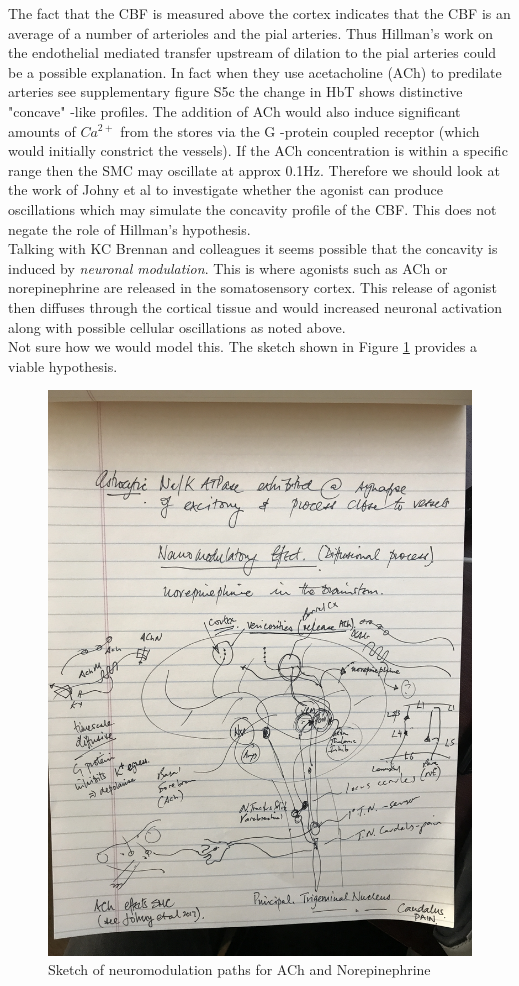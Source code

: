 \documentclass{article}
\begin{document}
{The fact that the CBF is measured above the cortex indicates that the CBF is an average of a number of arterioles and the pial arteries. Thus Hillman's work \cite{Chen2014a} on the endothelial mediated transfer upstream of dilation to the pial arteries could be a possible explanation. In fact when they use acetacholine (ACh) to predilate arteries see supplementary figure S5c the change in HbT shows distinctive "concave" -like profiles. The addition of ACh would also induce significant amounts of $Ca^{2+}$ from the stores via the G -protein coupled receptor (which would initially constrict the vessels). If the ACh concentration is within a specific range then the SMC may oscillate at approx 0.1Hz. Therefore we should look at the work of Johny et al \cite{Johny2017} to investigate whether the agonist can produce oscillations which may simulate the concavity profile of the CBF. This does not negate the role of Hillman's hypothesis.\\
Talking with KC Brennan and colleagues it seems possible that the concavity is induced by \textit{neuronal modulation}. This is where agonists such as ACh or norepinephrine are released in the somatosensory cortex. This release of agonist then diffuses through the cortical tissue and would increased neuronal activation along with possible cellular oscillations as noted above. \\
Not sure how we would model this. The sketch shown in Figure \ref{fig:Neuromodulation_paths} provides a viable hypothesis. }
\begin{figure}[h!]
\centering
\includegraphics[width=0.7\linewidth, angle = -90]{./Figures/Neuromodulation_paths}
\caption{Sketch of neuromodulation paths for ACh and Norepinephrine}
\label{fig:Neuromodulation_paths}
\end{figure}
\end{document}
